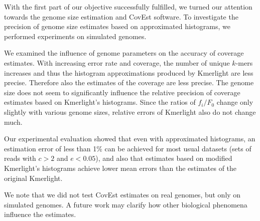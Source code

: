 \medskip

With the first part of our objective successfully fulfilled, we turned our attention towards
the genome size estimation and CovEst software. To investigate the precision of genome size 
estimates based on approximated histograms, we performed experiments on simulated genomes.

We examined the influence of genome parameters on the accuracy of coverage estimates.
With increasing error rate and coverage, the number of unique $k$-mers increases
and thus the histogram approximations produced by Kmerlight are less precise. Therefore
also the estimates of the coverage are less precise. The genome size does not seem to 
significantly influence the relative precision of coverage estimates based on Kmerlight's
histograms. Since the ratios of $f_i/F_0$ change only slightly with
various genome sizes, relative errors of Kmerlight also do not change much.

Our experimental evaluation showed that even with approximated histograms, an estimation error
of less than 1\% can be achieved for most usual datasets (sets of reads with $c > 2$ 
and $e < 0.05$), and also that estimates based on modified Kmerlight's histograms achieve 
lower mean errors than the estimates of the original Kmerlight. 

We note that we did not test CovEst estimates on real genomes, but only on simulated genomes. 
A future work may clarify how other biological phenomena influence the estimates. 

